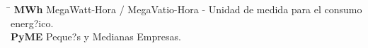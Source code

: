 \printnomenclature[2.5 cm]


\begin{tabbing}
\hspace*{2cm} \= \hspace*{5cm}  \kill
\textbf{MWh} \> MegaWatt-Hora / MegaVatio-Hora - Unidad de medida para el consumo energ?ico.\\
\textbf{PyME} \> Peque?s y Medianas Empresas.\\
\end{tabbing}


 
